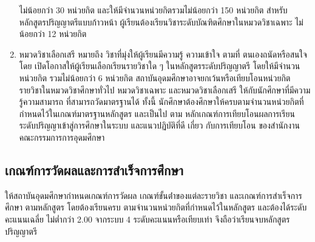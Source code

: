 \begin{enumerate}
ไม่น้อยกว่า 30 หน่วยกิต และให้มีจํานวนหน่วยกิตรวมไม่น้อยกว่า 150 หน่วยกิต
สําหรับหลักสูตรปริญญาตรีแบบก้าวหน้า ผู้เรียนต้องเรียนวิชาระดับบัณฑิตศึกษาในหมวดวิชาเฉพาะ
ไม่น้อยกว่า 12 หน่วยกิต
\item  หมวดวิชาเลือกเสรี หมายถึง วิชาที่มุ่งให้ผู้เรียนมีความรู้ ความเข้าใจ ตามที่ ตนเองถนัดหรือสนใจ โดย
เปิดโอกาสให้ผู้เรียนเลือกเรียนรายวิชาใด ๆ ในหลักสูตรระดับปริญญาตรี โดยให้มีจํานวนหน่วยกิต
รวมไม่น้อยกว่า 6 หน่วยกิต สถาบันอุดมศึกษาอาจยกเว้นหรือเทียบโอนหน่วยกิตรายวิชาในหมวดวิชาศึกษาทั่วไป หมวดวิชาเฉพาะ
และหมวดวิชาเลือกเสรี ให้กับนักศึกษาที่มีความรู้ความสามารถ ที่สามารถวัดมาตรฐานได้ ทั้งนี้ นักศึกษาต้องศึกษาให้ครบตามจํานวนหน่วยกิตที่กําหนดไว้ในเกณฑ์มาตรฐานหลักสูตร และเป็นไป ตาม
หลักเกณฑ์การเทียบโอนผลการเรียนระดับปริญญาเข้าสู่การศึกษาในระบบ และแนวปฏิบัติที่ดี เกี่ยว
กับการเทียบโอน ของสํานักงานคณะกรรมการการอุดมศึกษา
\end{enumerate}
\subsection{เกณฑ์การวัดผลและการสําเร็จการศึกษา}
ให้สถาบันอุดมศึกษากําหนดเกณฑ์การวัดผล เกณฑ์ขั้นต่ําของแต่ละรายวิชา และเกณฑ์การสําเร็จการศึกษา
ตามหลักสูตร โดยต้องเรียนครบ ตามจํานวนหน่วยกิตที่กําหนดไว้ในหลักสูตร และต้องได้ระดับคะแนนเฉลี่ย
ไม่ตํ่ากว่า 2.00 จากระบบ 4 ระดับคะแนนหรือเทียบเท่า จึงถือว่าเรียนจบหลักสูตรปริญญาตรี
